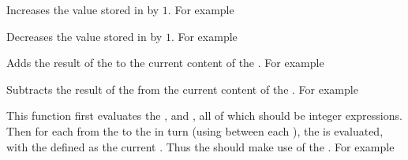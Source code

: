 \documentclass[oneside]{book}
\begin{document}
\begin{function}{\IntIncr}
\begin{syntax}
 
\end{syntax}
Increases the value stored in  by $1$.
For example
\begin{demo}
\IntSet{}
\IntIncr\lTmpaInt
\IntUse\lTmpaInt
\end{demo}
\end{function}

\begin{function}{\IntDecr}
\begin{syntax}
 
\end{syntax}
Decreases the value stored in  by $1$.
For example
\begin{demo}
\IntSet{}
\IntDecr\lTmpaInt
\IntUse\lTmpaInt
\end{demo}
\end{function}

\begin{function}{\IntAdd}
\begin{syntax}
  
\end{syntax}
Adds the result of the  to the current
content of the . For example
\begin{demo}
\IntSet{}
\IntAdd{}
\IntUse\lTmpaInt
\end{demo}
\end{function}

\begin{function}{\IntSub}
\begin{syntax}
  
\end{syntax}
Subtracts the result of the  from the
current content of the . For example
\begin{demo}
\IntSet{}
\IntSub{}
\IntUse\lTmpaInt
\end{demo}
\end{function}

\begin{function}{\IntStepVariable}
\begin{syntax}
     
\end{syntax}
This function first evaluates the , 
and , all of which should be integer expressions.
Then for each  from the  to the
 in turn (using  between each
), the  is evaluated,
with the  defined as the current .  Thus
the  should make use of the .
For example
\begin{demo}
\TlClear\lTmpaTl
{}\lTmpiTl{
  \TlPutRight\lTmpaTl{\Value\lTmpiTl}
  \TlPutRight\lTmpaTl{ }
}
\Result{\Value\lTmpaTl}
\end{demo}
\end{function}
\end{document}
